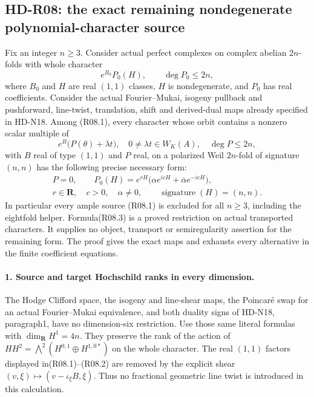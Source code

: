 \subsection{HD-R08: the exact remaining nondegenerate polynomial-character source}
\label{sec:nondegenerate-polynomial-orbits}

Fix an integer $n\ge3$. Consider actual perfect complexes on
complex abelian $2n$-folds with whole character
\[
                 e^{B_0}P_0(H),\qquad \deg P_0\le2n,          \tag{R08.1}
\]
where $B_0$ and $H$ are real $(1,1)$ classes, $H$ is
nondegenerate, and $P_0$ has real coefficients. Consider the
actual Fourier--Mukai, isogeny pullback and pushforward,
line-twist, translation, shift and derived-dual maps already
specified in HD-N18. Among (R08.1), every character whose orbit
contains a nonzero scalar multiple of
\[
                 e^B\bigl(P(\theta)+\lambda t\bigr),
       \quad0\ne\lambda t\in W_K(A),\quad\deg P\le2n,       \tag{R08.2}
\]
with $B$ real of type $(1,1)$ and $P$ real, on a polarized
Weil $2n$-fold of signature $(n,n)$ has the
following precise necessary form:
\[
 \begin{gathered}
 P=0,\qquad
 P_0(H)=e^{rH}\bigl(\alpha e^{icH}+\overline\alpha e^{-icH}\bigr),
 \\
 r\in\mathbf R,\quad c>0,\quad\alpha\ne0,
 \qquad \operatorname{signature}(H)=(n,n).                   \tag{R08.3}
 \end{gathered}
\]
In particular every ample source (R08.1) is excluded for all
$n\ge3$, including the eightfold helper. Formula(R08.3) is a
proved restriction on actual transported characters. It supplies
no object, transport or semiregularity assertion for the remaining
form. The proof gives the exact maps and exhausts every alternative
in the finite coefficient equations.

\paragraph{1. Source and target Hochschild ranks in every dimension.}
The Hodge Clifford space, the isogeny and line-shear maps, the
Poincar\'e swap for an actual Fourier--Mukai equivalence, and
both duality signs of HD-N18, paragraph1, have no dimension-six
restriction. Use those same literal formulas with
$\dim_{\mathbf R}H^1=4n$. They preserve the rank of the action
of $HH^2=\bigwedge^2(H^{0,1}\oplus H^{1,0*})$ on the whole
character. The real $(1,1)$ factors displayed in(R08.1)--(R08.2)
are removed by the explicit shear
$(v,\xi)\mapsto(v-\iota_\xi B,\xi)$. Thus no fractional
geometric line twist is introduced in this calculation.

